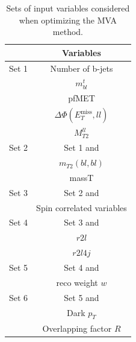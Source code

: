 \documentclass[a4paper, 10pt, openright]{report}
\begin{document}
\begin{appendices}
\begin{table}
\begin{center}
\begin{tabular}{ c|c } 
 \hline
  & Variables \\
\hline
\multirow{1}{*}{Set 1} & Number of b-jets \\
& $m_{bl}^t$ \\
& pf\ac{MET} \\
& $\Delta \Phi(E_{T}^{\text{miss}}, ll)$ \\
& $M_{T2}^{ll}$ \\
\hline
Set 2 & Set 1 and \\
& $m_{T2}(bl, bl)$ \\
& massT \\
\hline
Set 3 & Set 2 and \\
& Spin correlated variables \\
\hline
Set 4 & Set 3 and \\
& $r2l$ \\
& $r2l4j$ \\
\hline
Set 5 & Set 4 and \\
& reco weight $w$ \\
\hline
Set 6 & Set 5 and \\
& Dark $p_T$ \\
& Overlapping factor $R$ \\
 \hline
\end{tabular}
\caption{Sets of input variables considered when optimizing the \ac{MVA} method.}
\label{table:sets}
\end{center}
\end{table}

%


\end{appendices}
\end{document}
